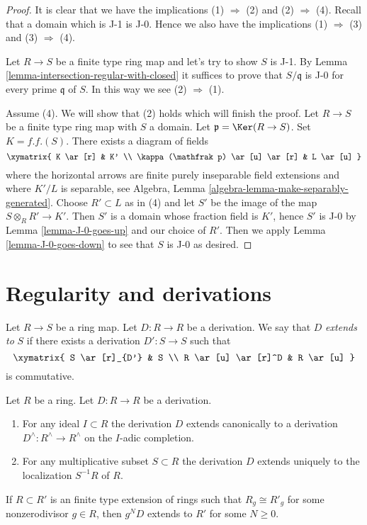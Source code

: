 \begin{proof}
It is clear that we have the implications (1) $\Rightarrow$ (2) and
(2) $\Rightarrow$ (4). Recall that a domain which is
J-1 is J-0. Hence we also have the implications
(1) $\Rightarrow$ (3) and (3) $\Rightarrow$ (4).

\medskip\noindent
Let $R \to S$ be a finite type ring map and let's try to show $S$ is J-1. By
Lemma \ref{lemma-intersection-regular-with-closed} it suffices
to prove that $S/\mathfrak q$ is J-0 for every prime $\mathfrak q$
of $S$. In this way we see (2) $\Rightarrow$ (1).

\medskip\noindent
Assume (4). We will show that (2) holds which will finish the proof.
Let $R \to S$ be a finite type ring map with $S$ a domain.
Let $\mathfrak p = \Ker(R \to S)$. Set $K = f.f.(S)$. There exists
a diagram of fields
$$
\xymatrix{
K \ar[r] & K' \\
\kappa(\mathfrak p) \ar[u] \ar[r] & L \ar[u]
}
$$
where the horizontal arrows are finite purely inseparable field extensions
and where $K'/L$ is separable, see
Algebra, Lemma \ref{algebra-lemma-make-separably-generated}.
Choose $R' \subset L$ as in (4) and let
$S'$ be the image of the map $S \otimes_R R' \to K'$.
Then $S'$ is a domain whose fraction field is $K'$, hence
$S'$ is J-0 by Lemma \ref{lemma-J-0-goes-up} and our choice of $R'$.
Then we apply Lemma \ref{lemma-J-0-goes-down} to see that $S$
is J-0 as desired.
\end{proof}



\section{Regularity and derivations}
\label{section-regularity-derivations}

\noindent
Let $R \to S$ be a ring map. Let $D : R \to R$ be a derivation.
We say that $D$ {\it extends to} $S$
if there exists a derivation $D' : S \to S$ such that
$$
\xymatrix{
S \ar[r]_{D'} & S \\
R \ar[u] \ar[r]^D & R \ar[u]
}
$$
is commutative.

\begin{lemma}
\label{lemma-derivation-extends}
Let $R$ be a ring. Let $D : R \to R$ be a derivation.
\begin{enumerate}
\item For any ideal $I \subset R$ the derivation $D$ extends
canonically to a derivation $D^\wedge : R^\wedge \to R^\wedge$
on the $I$-adic completion.
\item For any multiplicative subset $S \subset R$ the derivation
$D$ extends uniquely to the localization $S^{-1}R$ of $R$.
\end{enumerate}
If $R \subset R'$ is an finite type extension of rings such that
$R_g \cong R'_g$ for some nonzerodivisor $g \in R$, then $g^ND$ extends
to $R'$ for some $N \geq 0$.
\end{lemma}

